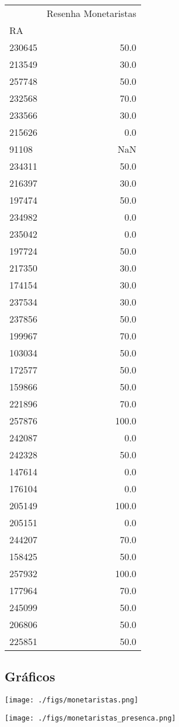 \documentclass[11pt]{article}
\begin{document}
\begin{tabular}{lr}
\toprule
{} &  Resenha Monetaristas \\
RA     &                       \\
\midrule
230645 &                  50.0 \\
213549 &                  30.0 \\
257748 &                  50.0 \\
232568 &                  70.0 \\
233566 &                  30.0 \\
215626 &                   0.0 \\
91108  &                   NaN \\
234311 &                  50.0 \\
216397 &                  30.0 \\
197474 &                  50.0 \\
234982 &                   0.0 \\
235042 &                   0.0 \\
197724 &                  50.0 \\
217350 &                  30.0 \\
174154 &                  30.0 \\
237534 &                  30.0 \\
237856 &                  50.0 \\
199967 &                  70.0 \\
103034 &                  50.0 \\
172577 &                  50.0 \\
159866 &                  50.0 \\
221896 &                  70.0 \\
257876 &                 100.0 \\
242087 &                   0.0 \\
242328 &                  50.0 \\
147614 &                   0.0 \\
176104 &                   0.0 \\
205149 &                 100.0 \\
205151 &                   0.0 \\
244207 &                  70.0 \\
158425 &                  50.0 \\
257932 &                 100.0 \\
177964 &                  70.0 \\
245099 &                  50.0 \\
206806 &                  50.0 \\
225851 &                  50.0 \\
\bottomrule
\end{tabular}

\subsection{Gráficos}
\label{sec:org866e68b}

\begin{center}
\texttt{[image: ./figs/monetaristas.png]}
\end{center}

\begin{center}
\texttt{[image: ./figs/monetaristas\_presenca.png]}
\end{center}
\end{document}
